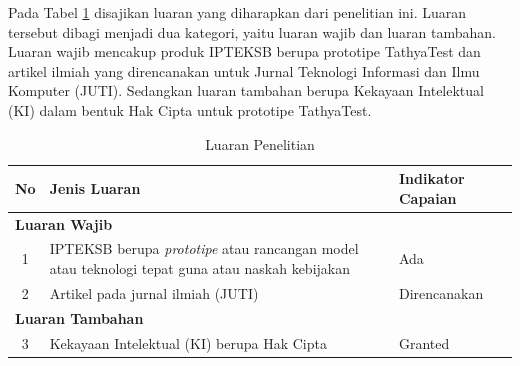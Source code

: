 Pada Tabel \ref{tab:luaran-penelitian} disajikan luaran yang diharapkan dari penelitian ini. Luaran tersebut dibagi menjadi dua kategori, yaitu luaran wajib dan luaran tambahan. Luaran wajib mencakup produk IPTEKSB berupa prototipe TathyaTest dan artikel ilmiah yang direncanakan untuk Jurnal Teknologi Informasi dan Ilmu Komputer (JUTI). Sedangkan luaran tambahan berupa Kekayaan Intelektual (KI) dalam bentuk Hak Cipta untuk prototipe TathyaTest.

\begin{table}[htbp]
\centering
\caption{Luaran Penelitian}
\label{tab:luaran-penelitian}
\begin{tabular}{|c|p{9cm}|p{5cm}|}
\hline
\textbf{No} & \textbf{Jenis Luaran} & \textbf{Indikator Capaian} \\
\hline
\multicolumn{3}{|l|}{\textbf{Luaran Wajib}} \\
\hline
1 & IPTEKSB berupa \textit{prototipe} atau rancangan model atau teknologi tepat guna atau naskah kebijakan & Ada \\
\hline
2 & Artikel pada jurnal ilmiah (JUTI) & Direncanakan \\
\hline
\multicolumn{3}{|l|}{\textbf{Luaran Tambahan}} \\
\hline
3 & Kekayaan Intelektual (KI) berupa Hak Cipta & Granted \\
\hline
\end{tabular}
\end{table}
